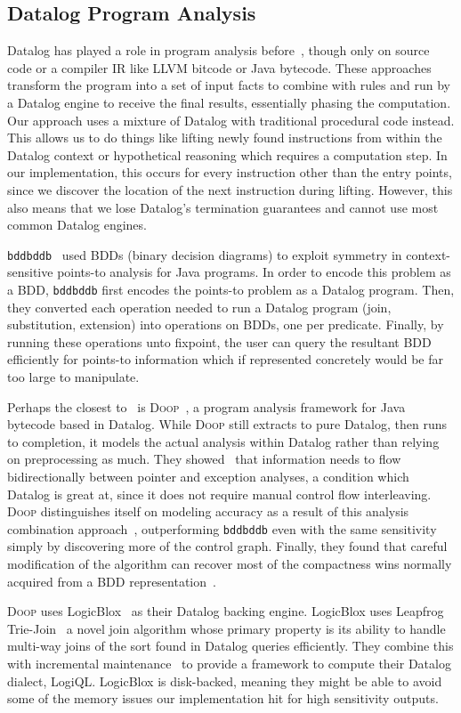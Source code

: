 \subsection{Datalog Program Analysis}
Datalog has played a role in program analysis before~\cite{bddbddb,doop1}, though only on source code or a compiler IR like LLVM bitcode or Java bytecode.
These approaches transform the program into a set of input facts to combine with rules and run by a Datalog engine to receive the final results, essentially phasing the computation.
Our approach uses a mixture of Datalog with traditional procedural code instead.
This allows us to do things like lifting newly found instructions from within the Datalog context or hypothetical reasoning which requires a computation step.
In our implementation, this occurs for every instruction other than the entry points, since we discover the location of the next instruction during lifting.
However, this also means that we lose Datalog's termination guarantees and cannot use most common Datalog engines.

\texttt{bddbddb}~\cite{bddbddb} used BDDs (binary decision diagrams) to exploit symmetry in context-sensitive points-to analysis for Java programs.
In order to encode this problem as a BDD, \texttt{bddbddb} first encodes the points-to problem as a Datalog program.
Then, they converted each operation needed to run a Datalog program (join, substitution, extension) into operations on BDDs, one per predicate.
Finally, by running these operations unto fixpoint, the user can query the resultant BDD efficiently for points-to information which if represented concretely would be far too large to manipulate.

Perhaps the closest to \aliasname\ is \textsc{Doop}~\cite{doop1,doop2,doop3}, a program analysis framework for Java bytecode based in Datalog.
While \textsc{Doop} still extracts to pure Datalog, then runs to completion, it models the actual analysis within Datalog rather than relying on preprocessing as much.
They showed~\cite{doop1} that information needs to flow bidirectionally between pointer and exception analyses, a condition which Datalog is great at, since it does not require manual control flow interleaving.
\textsc{Doop} distinguishes itself on modeling accuracy as a result of this analysis combination approach~\cite{doop2}, outperforming \texttt{bddbddb} even with the same sensitivity simply by discovering more of the control graph.
Finally, they found that careful modification of the algorithm can recover most of the compactness wins normally acquired from a BDD representation~\cite{doop3}.

\textsc{Doop} uses LogicBlox~\cite{logicblox} as their Datalog backing engine.
LogicBlox uses Leapfrog Trie-Join~\cite{lftj} a novel join algorithm whose primary property is its ability to handle multi-way joins of the sort found in Datalog queries efficiently.
They combine this with incremental maintenance~\cite{lftj-incr} to provide a framework to compute their Datalog dialect, LogiQL.
LogicBlox is disk-backed, meaning they might be able to avoid some of the memory issues our implementation hit for high sensitivity outputs.
